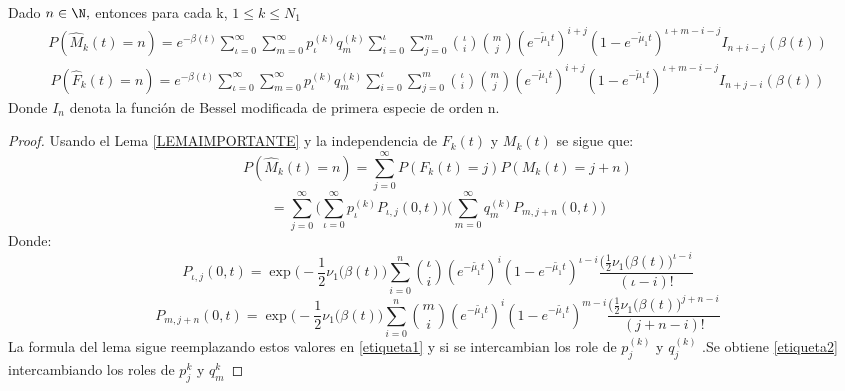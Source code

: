 \begin{Lem}
    Dado $n\in\N,$ entonces para cada k, $1\leq k\leq N_1$
    \begin{eqnarray}
        P(\hat{M}_k(t)=n)=e^{-\beta(t)}\sum_{\iota=0}^\infty\sum_{m=0}^\infty p_{\iota}^{(k)} q_m^{(k)}\sum_{i=0}^\iota\sum_{j=0}^m{\iota\choose i}{m\choose j} (e^{-\tilde{\mu}_1t})^{i+j}(1-e^{-\tilde{\mu}_1t})^{\iota+m-i-j}I_{n+i-j}(\beta(t))
        \label{etiqueta1}
    \end{eqnarray}
    \begin{eqnarray}
        P(\hat{F}_k(t)=n)=e^{-\beta(t)}\sum_{\iota=0}^\infty\sum_{m=0}^\infty p_{\iota}^{(k)} q_m^{(k)}\sum_{i=0}^\iota\sum_{j=0}^m{\iota\choose i}{m\choose j} (e^{-\tilde{\mu}_1t})^{i+j}(1-e^{-\tilde{\mu}_1t})^{\iota+m-i-j}I_{n+j-i}(\beta(t))
        \label{etiqueta2}
    \end{eqnarray}
    Donde $I_n$ denota la función de Bessel modificada de primera especie de orden n.
    \begin{proof}
        Usando el Lema \ref{LEMAIMPORTANTE} y la independencia de $F_k(t)$ y $M_k(t)$ se sigue que:
        $$P(\hat{M}_k(t)=n)=\sum_{j=0}^\infty P(F_k(t)=j)P(M_k(t)=j+n)$$
        $$=\sum_{j=0}^\infty \big(\sum_{\iota=0}^\infty p_{\iota}^{(k)} P_{\iota ,j}(0,t) \big)\big(\sum_{m=0}^\infty q_m^{(k)}P_{m,j+n}(0,t)\big)$$
        Donde:
        $$P_{\iota ,j}(0,t)=\exp\big(-\frac{1}{2}\nu_1(\beta(t)\big)\sum_{i=0}^n{\iota \choose i}(e^{-\tilde{\mu_1}t})^i(1-e^{-\tilde{\mu_1}t})^{\iota-i}\frac{\big(\frac{1}{2}\nu_1(\beta(t)\big)^{\iota-i}}{(\iota-i)!}$$
        $$P_{m ,j+n}(0,t)=\exp\big(-\frac{1}{2}\nu_1(\beta(t)\big)\sum_{i=0}^n{m \choose i}(e^{-\tilde{\mu_1}t})^i(1-e^{-\tilde{\mu_1}t})^{m-i}\frac{\big(\frac{1}{2}\nu_1(\beta(t)\big)^{j+n-i}}{(j+n-i)!}$$
        La formula del lema sigue reemplazando estos valores en \ref{etiqueta1} y si se intercambian los role de $p_j^{(k)}$ y $q_j^{(k)}$ .Se obtiene \ref{etiqueta2} intercambiando los roles de $p_j^{k}$ y $q_m^{k}$
    \end{proof}
\end{Lem}